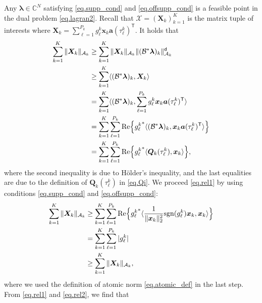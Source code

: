 \documentclass[conference,10pt]{IEEEtran}
\theoremstyle{remark}
\theoremstyle{plain}
\theoremstyle{definition}
\theoremstyle{remark}
\begin{document}
Any $\bm{\lambda}\in\mathbb{C}^N$ satisfying \eqref{eq.supp_cond} and \eqref{eq.offsupp_cond} is a feasible point in the dual problem \eqref{eq.lagran2}. Recall that $\bm{\mathcal{X}}=(\bm{X}_k)_{k=1}^K$ is the matrix tuple of interests where $\bm{X}_k=\sum_{\ell=1}^{P_k}g_{\ell}^k\bm{x}_k\bm{a}(\tau_{\ell}^k)^{\mathsf{T}}$. It holds that
\begin{align}\label{eq.rel1}
\sum_{k=1}^K\|\bm{X}_k\|_{\mathcal{A}_k}&\ge \sum_{k=1}^K\|\bm{X}_k\|_{\mathcal{A}_k}\|(\mathcal{B}^*\bm{\lambda})_k\|_{\mathcal{A}_k}^{\mathsf{d}}\nonumber\\ \nonumber
& \ge\sum_{k=1}^K\langle (\mathcal{B}^*\bm{\lambda})_k, \bm{X}_k \rangle\\ 
&=\sum_{k=1}^K\langle (\mathcal{B}^*\bm{\lambda})_k, \sum_{\ell=1}^{P_k}g_{\ell}^k\bm{x}_k\bm{a}(\tau_{\ell}^k)^{\mathsf{T}} \rangle\nonumber\\
&=\sum_{k=1}^K\sum_{\ell=1}^{P_k}{\rm Re}\Big\{{g_{\ell}^k}^*\langle (\mathcal{B}^{\ast}\bm{\lambda})_k, \bm{x}_k\bm{a}(\tau_{\ell}^k)^{\mathsf{T}} \rangle \Big\} \nonumber\\
&=\sum_{k=1}^K\sum_{\ell=1}^{P_k}{\rm Re}\Big\{{g_{\ell}^k}^*\langle \bm{Q}_k(\tau_{\ell}^k), \bm{x}_k \rangle\Big\},
\end{align}
where the second inequality is due to H\"{o}lder's inequality, and the last equalities are due to the definition of $\bm{Q}_k(\tau_{\ell}^k)$ in \eqref{eq.Qi}. We proceed \eqref{eq.rel1} by using conditions \eqref{eq.supp_cond} and \eqref{eq.offsupp_cond}:
\begin{align}\label{eq.rel2}
\sum_{k=1}^K\|\bm{X}_k\|_{\mathcal{A}_k}&\ge \sum_{k=1}^K\sum_{\ell=1}^{P_k}{\rm Re}\Big\{{g_{\ell}^k}^*\langle \frac{1}{\|\bm{x}_k\|_2^2}{\rm sgn}(g_{\ell}^k)\bm{x}_k, \bm{x}_k \rangle\Big\}  \nonumber\\
& = \sum_{k=1}^K\sum_{\ell=1}^{P_k}|g_{\ell}^k|\nonumber\\
&\ge\sum_{k=1}^K\|\bm{X}_k\|_{\mathcal{A}_k},
\end{align}
where we used the definition of atomic norm \eqref{eq.atomic_def} in the last step. From \eqref{eq.rel1} and \eqref{eq.rel2}, we find that 
\end{document}
